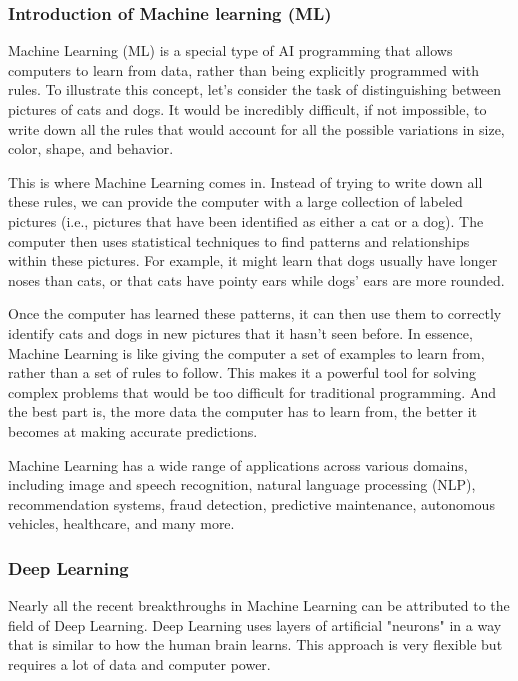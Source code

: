 \documentclass{article}
\begin{document}
\subsubsection{Introduction of Machine learning (ML)}

Machine Learning (ML) is a special type of AI programming that allows
computers to learn from data, rather than being explicitly programmed
with rules. To illustrate this concept, let's consider the task of
distinguishing between pictures of cats and dogs. It would be incredibly
difficult, if not impossible, to write down all the rules that would
account for all the possible variations in size, color, shape, and
behavior.

This is where Machine Learning comes in. Instead of trying to write down
all these rules, we can provide the computer with a large collection of
labeled pictures (i.e., pictures that have been identified as either a cat
or a dog). The computer then uses statistical techniques to find patterns
and relationships within these pictures. For example, it might learn that
dogs usually have longer noses than cats, or that cats have pointy ears
while dogs' ears are more rounded.

Once the computer has learned these patterns, it can then use them
to correctly identify cats and dogs in new pictures that it hasn't
seen before. In essence, Machine Learning is like giving the computer
a set of examples to learn from, rather than a set of rules to follow.
This makes it a powerful tool for solving complex problems that would
be too difficult for traditional programming. And the best part is,
the more data the computer has to learn from, the better it becomes
at making accurate predictions.

Machine Learning has a wide range of applications across various
domains, including image and speech recognition, natural language
processing (NLP), recommendation systems, fraud detection, predictive
maintenance, autonomous vehicles, healthcare, and many more.

\subsubsection{Deep Learning}

Nearly all the recent breakthroughs in Machine Learning can be attributed
to the field of Deep Learning. Deep Learning uses layers of artificial
"neurons" in a way that is similar to how the human brain learns.
This approach is very flexible but requires a lot of data and computer
power.
\end{document}
